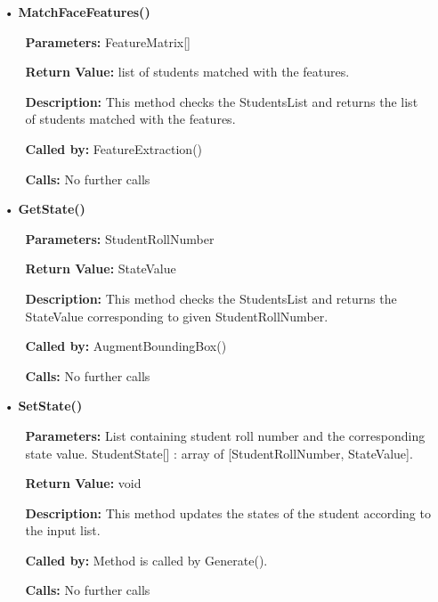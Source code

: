 \documentclass{scrreprt}
\begin{document}
\begin{enumerate}
\begin{itemize}
\item [•] \textbf{MatchFaceFeatures()}
\begin{itemize}	
\item [] \textbf{Parameters:} FeatureMatrix[]
\item [] \textbf{Return Value:} list of students matched with the features.
\item [] \textbf{Description:} This method checks the StudentsList and returns the list of students matched with the features.
\item [] \textbf{Called by:} FeatureExtraction()
\item [] \textbf{Calls:} No further calls
\end{itemize}

\item [•] \textbf{GetState()}
\begin{itemize}	
\item [] \textbf{Parameters:} StudentRollNumber
\item [] \textbf{Return Value:} StateValue
\item [] \textbf{Description:} This method checks the StudentsList and returns the StateValue corresponding to given StudentRollNumber.
\item [] \textbf{Called by:} AugmentBoundingBox() 
\item [] \textbf{Calls:} No further calls
\end{itemize}

\item [•] \textbf{SetState()}
\begin{itemize}	
\item [] \textbf{Parameters:} List containing student roll number and the corresponding state value. StudentState[] : array of [StudentRollNumber, StateValue].
\item [] \textbf{Return Value:} void
\item [] \textbf{Description:} This method updates the states of the student according to the input list.
\item [] \textbf{Called by:} Method is called by Generate().
\item [] \textbf{Calls:} No further calls
\end{itemize}
\end{itemize}
\end{enumerate}
\end{document}
